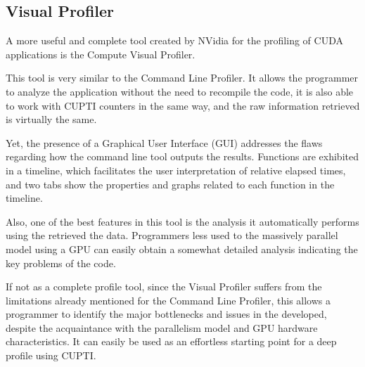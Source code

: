 \subsection{Visual Profiler}
\label{sec:340}

A more useful and complete tool created by NVidia for the profiling of CUDA applications is the Compute Visual Profiler.

This tool is very similar to the Command Line Profiler. It allows the programmer to analyze the application without the need to recompile the code, it is also able to work with CUPTI counters in the same way, and the raw information retrieved is virtually the same.

Yet, the presence of a Graphical User Interface (GUI) addresses the flaws regarding how the command line tool outputs the results. Functions are exhibited in a timeline, which facilitates the user interpretation of relative elapsed times, and two tabs show the properties and graphs related to each function in the timeline.

Also, one of the best features in this tool is the analysis it automatically performs using the retrieved the data. Programmers less used to the massively parallel model using a GPU can easily obtain a somewhat detailed analysis indicating the key problems of the code.

If not as a complete profile tool, since the Visual Profiler suffers from the limitations already mentioned for the Command Line Profiler, this allows a programmer to identify the major bottlenecks and issues in the developed, despite the acquaintance with the parallelism model and GPU hardware characteristics. It can easily be used as an effortless starting point for a deep profile using CUPTI.
